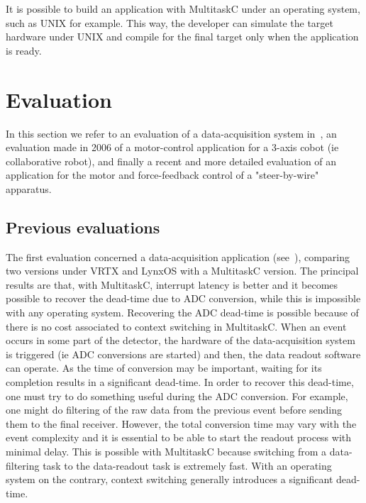 \documentclass[10pt]{report}
\begin{document}
It is possible to build an application with MultitaskC under an operating system, such as UNIX for example. This way, 
the developer can simulate the target hardware under UNIX and compile for the final target only when the application is ready.

\chapter{Evaluation}
\label{sec:evaluation}

In this section we refer to an evaluation of a data-acquisition system in~\cite{Delchini:95}, 
an evaluation made in 2006 of a motor-control application for a 3-axis cobot (ie collaborative robot), and finally a 
recent and more detailed evaluation of an application for the motor and force-feedback control of a "steer-by-wire" apparatus.

\section{Previous evaluations}

The first evaluation concerned a data-acquisition application (see~\cite{Delchini:95}), comparing two versions under VRTX and LynxOS 
with a MultitaskC version. The principal results are that, with MultitaskC, interrupt latency is better and it becomes possible 
to recover the dead-time due to ADC conversion, while this is impossible with any operating system. 
Recovering the ADC dead-time is possible because of there is no cost associated to context switching in MultitaskC. 
When an event occurs in some part of the detector, the hardware of the data-acquisition system is triggered (ie ADC conversions are
started) and then, the data readout software can operate. As the time of conversion may be important, waiting for its completion 
results in a significant dead-time. In order to recover this dead-time, one must try to do something useful during the ADC 
conversion. For example, one might do filtering of the raw data from the previous event before sending them to the final receiver. 
However, the total conversion time may vary with the event complexity and it is essential to be able to start the readout process 
with minimal delay. This is possible with MultitaskC because switching from a data-filtering task to the data-readout task is 
extremely fast. With an operating system on the contrary, context switching generally introduces a significant dead-time.
\end{document}
